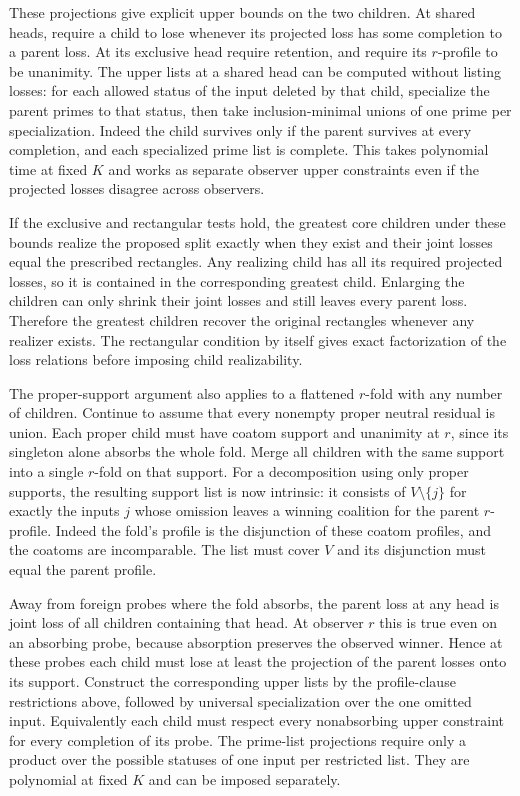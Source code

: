 These projections give explicit upper bounds on
the two children. At shared heads, require a child
to lose whenever its projected loss has some
completion to a parent loss. At its exclusive head
require retention, and require its $r$-profile to
be unanimity. The upper lists at a shared head can
be computed without listing losses: for each
allowed status of the input deleted by that child,
specialize the parent primes to that status, then
take inclusion-minimal unions of one prime per
specialization. Indeed the child survives only if
the parent survives at every completion, and each
specialized prime list is complete. This takes
polynomial time at fixed $K$ and works as separate
observer upper constraints even if the projected
losses disagree across observers.

If the exclusive and rectangular tests hold, the
greatest core children under these bounds realize
the proposed split exactly when they exist and
their joint losses equal the prescribed rectangles.
Any realizing child has all its required projected
losses, so it is contained in the corresponding
greatest child. Enlarging the children can only
shrink their joint losses and still leaves every
parent loss. Therefore the greatest children
recover the original rectangles whenever any
realizer exists. The rectangular condition by
itself gives exact factorization of the loss
relations before imposing child realizability.

The proper-support argument also applies to a
flattened $r$-fold with any number of children.
Continue to assume that every nonempty proper
neutral residual is union. Each proper child must
have coatom support and unanimity at $r$, since
its singleton alone absorbs the whole fold. Merge
all children with the same support into a single
$r$-fold on that support. For a decomposition
using only proper supports, the resulting support
list is now intrinsic: it consists of
$V\setminus\{j\}$ for exactly the inputs $j$ whose
omission leaves a winning coalition for the parent
$r$-profile. Indeed the fold's profile is the
disjunction of these coatom profiles, and the
coatoms are incomparable. The list must cover $V$
and its disjunction must equal the parent profile.

Away from foreign probes where the fold absorbs,
the parent loss at any head is joint loss of all
children containing that head. At observer $r$
this is true even on an absorbing probe, because
absorption preserves the observed winner. Hence
at these probes each child must lose at least the
projection of the parent losses onto its support.
Construct the corresponding upper lists by the
profile-clause restrictions above, followed by
universal specialization over the one omitted
input. Equivalently each child must respect every
nonabsorbing upper constraint for every completion
of its probe. The prime-list projections require
only a product over the possible statuses of one
input per restricted list. They are polynomial
at fixed $K$ and can be imposed separately.

